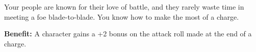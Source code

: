 
Your people are known for their love of battle, and they rarely waste time in meeting a foe blade-to-blade. You know how to make the most of a charge.

\textbf{Benefit:} A character gains a +2 bonus on the attack roll made at the end of a charge.